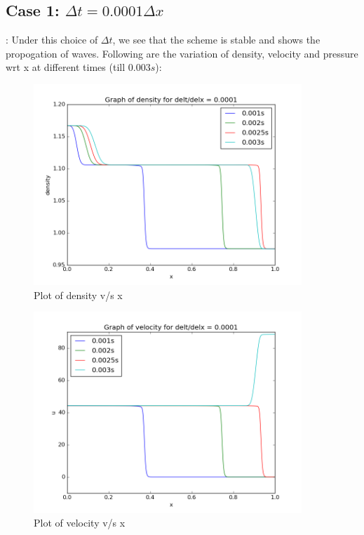 \documentclass[11pt, a4paper]{article}
\begin{document}
\subsection{Case 1: $\Delta t = 0.0001\Delta x$}:
Under this choice of $\Delta t$, we see that the scheme is stable and shows the propogation of waves. Following are the variation
of density, velocity and pressure wrt x at different times (till $0.003s$):
\begin{figure}[H]
 \centering
 \includegraphics[width = 0.9\textwidth]{FTCS2_1_1.png}
 \caption{Plot of density v/s x}
\end{figure}
\begin{figure}[H]
 \centering
 \includegraphics[width = 0.9\textwidth]{FTCS2_1_4.png}
 \caption{Plot of velocity v/s x}
\end{figure}
\end{document}
